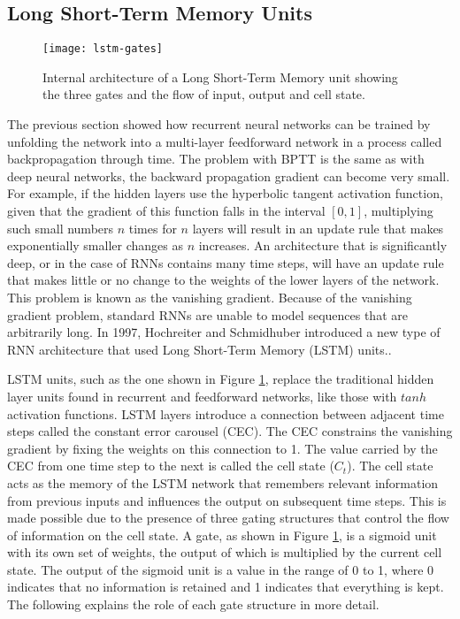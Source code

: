 \subsection{Long Short-Term Memory Units} \label{sec:background-sequential-models-long-short-term-memory-units}

\begin{figure}[t]
	\centering
	\texttt{[image: lstm-gates]}
	\caption{Internal architecture of a Long Short-Term Memory unit showing the three gates and the flow of input, output and cell state\cite{LSTM}.}
	\label{fig:memory-cell}
\end{figure}

The previous section showed how recurrent neural networks can be trained by unfolding the network into a multi-layer feedforward network in a process called backpropagation through time. The problem with BPTT is the same as with deep neural networks, the backward propagation gradient can become very small. For example, if the hidden layers use the hyperbolic tangent activation function, given that the gradient of this function falls in the interval $[0, 1]$, multiplying such small numbers $n$ times for $n$ layers will result in an update rule that makes exponentially smaller changes as $n$ increases. An architecture that is significantly deep, or in the case of RNNs contains many time steps, will have an update rule that makes little or no change to the weights of the lower layers of the network\cite{Bengio:1994:LLD:2325857.2328340}. This problem is known as the vanishing gradient. Because of the vanishing gradient problem, standard RNNs are unable to model sequences that are arbitrarily long. In 1997, Hochreiter and Schmidhuber introduced a new type of RNN architecture that used Long Short-Term Memory (LSTM) units.\cite{hochreiter1997long}. 

LSTM units, such as the one shown in Figure \ref{fig:memory-cell}, replace the traditional hidden layer units found in recurrent and feedforward networks, like those with $tanh$ activation functions. LSTM layers introduce a connection between adjacent time steps called the constant error carousel (CEC). The CEC constrains the vanishing gradient by fixing the weights on this connection to 1. The value carried by the CEC from one time step to the next is called the cell state ($C_t$). The cell state acts as the memory of the LSTM network that remembers relevant information from previous inputs and influences the output on subsequent time steps. This is made possible due to the presence of three gating structures that control the flow of information on the cell state. A gate, as shown in Figure \ref{fig:memory-cell}, is a sigmoid unit with its own set of weights, the output of which is multiplied by the current cell state. The output of the sigmoid unit is a value in the range of 0 to 1, where 0 indicates that no information is retained and 1 indicates that everything is kept\cite{LSTM}. The following explains the role of each gate structure in more detail.

